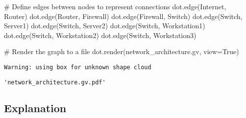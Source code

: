 \documentclass[
  letterpaper,
  DIV=11,
  numbers=noendperiod]{scrreprt}
\newenvironment{Shaded}{\begin{snugshade}}{\end{snugshade}}
\newcommand{\CommentTok}[1]{\textcolor[rgb]{0.37,0.37,0.37}{#1}}
\newcommand{\NormalTok}[1]{\textcolor[rgb]{0.00,0.23,0.31}{#1}}
\newcommand{\OperatorTok}[1]{\textcolor[rgb]{0.37,0.37,0.37}{#1}}
\newcommand{\StringTok}[1]{\textcolor[rgb]{0.13,0.47,0.30}{#1}}
\newcommand{\VariableTok}[1]{\textcolor[rgb]{0.07,0.07,0.07}{#1}}
\begin{document}
\begin{Shaded}
\begin{Highlighting}[]
\CommentTok{\# Define edges between nodes to represent connections}
\NormalTok{dot.edge(}\StringTok{\textquotesingle{}Internet\textquotesingle{}}\NormalTok{, }\StringTok{\textquotesingle{}Router\textquotesingle{}}\NormalTok{)}
\NormalTok{dot.edge(}\StringTok{\textquotesingle{}Router\textquotesingle{}}\NormalTok{, }\StringTok{\textquotesingle{}Firewall\textquotesingle{}}\NormalTok{)}
\NormalTok{dot.edge(}\StringTok{\textquotesingle{}Firewall\textquotesingle{}}\NormalTok{, }\StringTok{\textquotesingle{}Switch\textquotesingle{}}\NormalTok{)}
\NormalTok{dot.edge(}\StringTok{\textquotesingle{}Switch\textquotesingle{}}\NormalTok{, }\StringTok{\textquotesingle{}Server1\textquotesingle{}}\NormalTok{)}
\NormalTok{dot.edge(}\StringTok{\textquotesingle{}Switch\textquotesingle{}}\NormalTok{, }\StringTok{\textquotesingle{}Server2\textquotesingle{}}\NormalTok{)}
\NormalTok{dot.edge(}\StringTok{\textquotesingle{}Switch\textquotesingle{}}\NormalTok{, }\StringTok{\textquotesingle{}Workstation1\textquotesingle{}}\NormalTok{)}
\NormalTok{dot.edge(}\StringTok{\textquotesingle{}Switch\textquotesingle{}}\NormalTok{, }\StringTok{\textquotesingle{}Workstation2\textquotesingle{}}\NormalTok{)}
\NormalTok{dot.edge(}\StringTok{\textquotesingle{}Switch\textquotesingle{}}\NormalTok{, }\StringTok{\textquotesingle{}Workstation3\textquotesingle{}}\NormalTok{)}

\CommentTok{\# Render the graph to a file}
\NormalTok{dot.render(}\StringTok{\textquotesingle{}network\_architecture.gv\textquotesingle{}}\NormalTok{, view}\OperatorTok{=}\VariableTok{True}\NormalTok{)}
\end{Highlighting}
\end{Shaded}

\begin{verbatim}
Warning: using box for unknown shape cloud
\end{verbatim}

\begin{verbatim}
'network_architecture.gv.pdf'
\end{verbatim}

\subsection{Explanation}\label{explanation}
\end{document}
